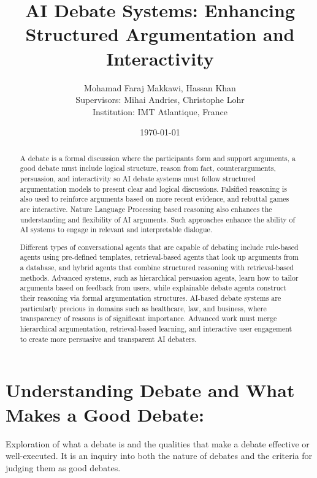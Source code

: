 \documentclass[12pt]{article}
\title{AI Debate Systems: Enhancing Structured Argumentation and Interactivity}
\author{Mohamad Faraj Makkawi, Hassan Khan\\
    Supervisors: Mihai Andries, Christophe Lohr\\
    Institution: IMT Atlantique, France}
\date{\today}
\begin{document}
\maketitle

\begin{abstract}
    A debate is a formal discussion where the participants form and support arguments, a good debate must include logical structure, reason from fact, counterarguments, persuasion, and interactivity so AI debate systems must follow structured argumentation models to present clear and logical discussions. Falsified reasoning is also used to reinforce arguments based on more recent evidence, and rebuttal games are interactive. Nature Language Processing based reasoning also enhances the understanding and flexibility of AI arguments. Such approaches enhance the ability of AI systems to engage in relevant and interpretable dialogue.

    Different types of conversational agents that are capable of debating include rule-based agents using pre-defined templates, retrieval-based agents that look up arguments from a database, and hybrid agents that combine structured reasoning with retrieval-based methods. Advanced systems, such as hierarchical persuasion agents, learn how to tailor arguments based on feedback from users, while explainable debate agents construct their reasoning via formal argumentation structures. AI-based debate systems are particularly precious in domains such as healthcare, law, and business, where transparency of reasons is of significant importance. Advanced work must merge hierarchical argumentation, retrieval-based learning, and interactive user engagement to create more persuasive and transparent AI debaters.
\end{abstract}

\newpage

\section{Understanding Debate and What Makes a Good Debate:}
\begin{small}
    Exploration of what a debate is and the qualities that make a debate effective or well-executed. It is an inquiry into both the nature of debates and the criteria for judging them as good debates.
\end{small}
\end{document}
